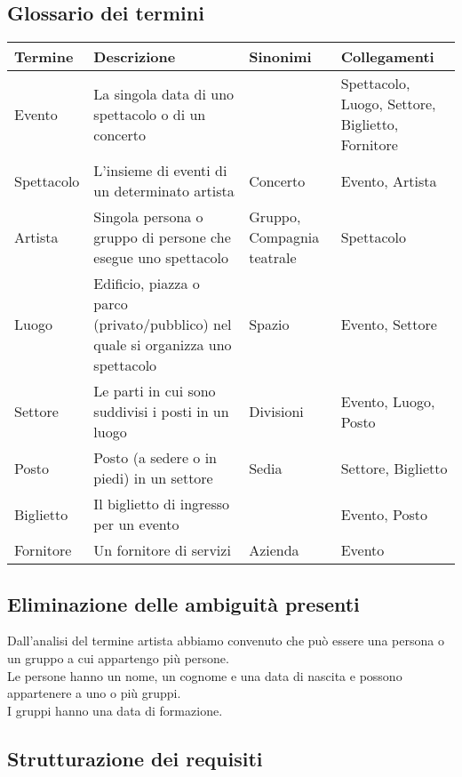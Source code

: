 \documentclass[a4paper,11pt]{article}
\begin{document}
\subsection{Glossario dei termini}

\begin{tabularx}{\textwidth}{|X|>{\raggedright\arraybackslash}X|X|>{\raggedright\arraybackslash}X|}
\hline
\textbf{Termine} & \textbf{Descrizione} & \textbf{Sinonimi} & \textbf{Collegamenti}\\
\hline
Evento & La singola data di uno spettacolo o di un concerto &  & Spettacolo, Luogo, Settore, Biglietto, Fornitore\\
\hline
Spettacolo & L'insieme di eventi di un determinato artista & Concerto & Evento, Artista\\
\hline
Artista & Singola persona o gruppo di persone che esegue uno spettacolo & Gruppo, Compagnia teatrale & Spettacolo\\
\hline
Luogo & Edificio, piazza o parco (privato/pubblico) nel quale si organizza uno spettacolo & Spazio & Evento, Settore\\
\hline
Settore & Le parti in cui sono suddivisi i posti in un luogo & Divisioni & Evento, Luogo, Posto\\
\hline
Posto & Posto (a sedere o in piedi) in un settore & Sedia & Settore, Biglietto\\
\hline
Biglietto & Il biglietto di ingresso per un evento &  & Evento, Posto\\
\hline
Fornitore & Un fornitore di servizi & Azienda & Evento\\
\hline
\end{tabularx}

\subsection{Eliminazione delle ambiguità presenti}

Dall'analisi del termine artista abbiamo convenuto che può essere una persona o un gruppo a cui appartengo più persone.\\
Le persone hanno un nome, un cognome e una data di nascita e possono appartenere a uno o più gruppi.\\
I gruppi hanno una data di formazione.

\subsection{Strutturazione dei requisiti}
\end{document}
